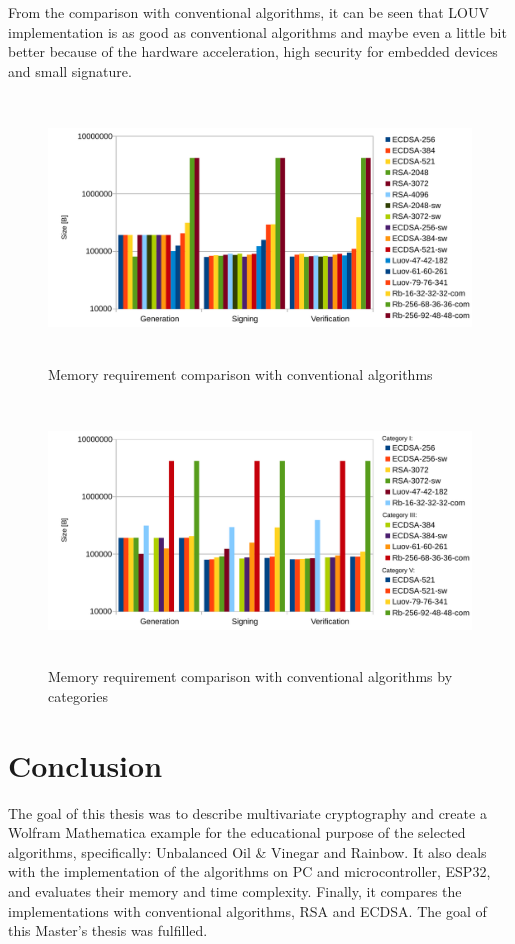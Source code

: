 \documentclass[thesis=M,english]{FITthesis}[2019/12/23]
\begin{document}
\bigskip
\noindent
From the comparison with conventional algorithms, it can be seen that LOUV implementation is as good as conventional algorithms and maybe even a little bit better because of the hardware acceleration, high security for embedded devices and small signature.

\begin{figure}[H]
\centering
\includegraphics[width=13cm,height=7cm]{images/mem-all.pdf}
\caption{Memory requirement comparison with conventional algorithms}
\label{mem-all}
\end{figure}

\bigskip\bigskip\bigskip
\begin{figure}[H]
\centering
\includegraphics[width=13cm,height=7cm]{images/mem-category-all.pdf}
\caption{Memory requirement comparison with conventional algorithms by categories}
\label{mem-category-all}
\end{figure}

\chapter{Conclusion}
The goal of this thesis was to describe multivariate cryptography and create a Wolfram  Mathematica example for the educational purpose of the selected algorithms, specifically: Unbalanced Oil \& Vinegar and Rainbow. It also deals with the implementation of the algorithms on PC and microcontroller, ESP32, and evaluates their memory and time complexity. Finally, it compares the implementations with conventional algorithms, RSA and ECDSA. The goal of this Master's thesis was fulfilled.
\end{document}
